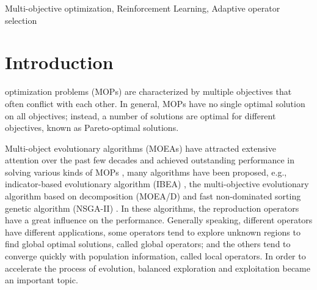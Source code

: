 \documentclass[journal]{IEEEtran}
\begin{document}
\begin{IEEEkeywords}
  Multi-objective optimization, Reinforcement Learning, Adaptive operator selection
\end{IEEEkeywords}

\section{Introduction}

 optimization problems (MOPs) are characterized by multiple objectives that often conflict with each other\cite{zhang2014efficient}. In general, MOPs have no single optimal solution on all objectives; instead, a number of solutions are optimal for different objectives, known as Pareto-optimal solutions.

Multi-object evolutionary algorithms (MOEAs) have attracted extensive attention over the past few decades and achieved outstanding performance in solving various kinds of MOPs \cite{fialho2010adaptive},
many algorithms have been proposed, e.g., indicator-based evolutionary algorithm (IBEA) \cite{IBEA}, the multi-objective evolutionary algorithm based on decomposition (MOEA/D) \cite{moead} and fast non-dominated sorting genetic algorithm (NSGA-II) \cite{nsga2}.
In these algorithms, the reproduction operators have a great influence on the performance.
Generally speaking, different operators have different applications, some operators tend to explore unknown regions to find global optimal solutions, called global operators; and the others tend to converge quickly with population information, called local operators.
In order to accelerate the process of evolution, balanced exploration and exploitation became an important topic.
\end{document}
